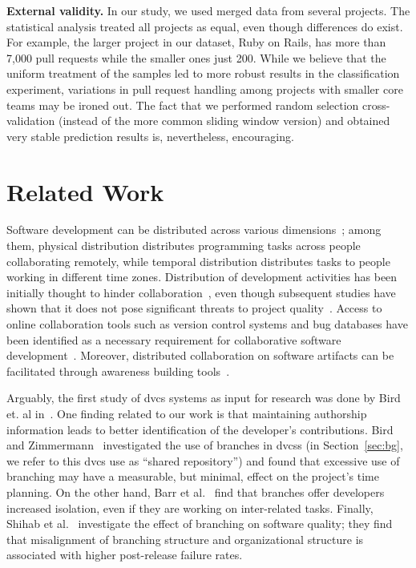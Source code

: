 \documentclass{sig-alternate}
\begin{document}
\textbf{External validity.} In our study, we used merged data from several
projects. The statistical analysis treated all projects as equal, even though
differences do exist.  For example, the larger project in our dataset, Ruby on
Rails, has more than 7,000 pull requests while the smaller ones just 200.  While
we believe that the uniform treatment of the samples led to more robust results
in the classification experiment, variations in pull request handling among
projects with smaller core teams may be ironed out.  The fact that we performed
random selection cross-validation (instead of the more common sliding window
version) and obtained very stable prediction results is, nevertheless,
encouraging.

\section{Related Work}

Software development can be distributed across various
di\-men\-sions~\cite{Gumm06}; among them, physical distribution distributes
programming tasks across people collaborating remotely, while temporal
distribution distributes tasks to people working in different time zones.
Distribution of development activities has been initially thought to hinder
collaboration~\cite{Herbs99, Batti01}, even though subsequent studies have
shown that it does not pose significant threats to project
quality~\cite{Spine06, Nguye08, Bird09a}. Access to online collaboration tools
such as version control systems and bug databases have been identified as a necessary
requirement for collaborative software development~\cite{Catal06}. Moreover, distributed collaboration on software artifacts can be
facilitated through awareness building tools~\cite{Dabbi12, Lanza10}. 

Arguably, the first study of {\sc dvcs} systems as input for research was done
by Bird et. al in~\cite{Bird09}. One finding related to our work is that
maintaining authorship information leads to better identification of the
developer's contributions. Bird and Zimmermann~\cite{Bird12} investigated the
use of branches in {\sc dvcs}s (in Section~\ref{sec:bg}, we refer to this {\sc
dvcs} use as ``shared repository'') and found that excessive use of branching
may have a measurable, but minimal, effect on the project's time planning.
On the other hand, Barr et al.~\cite{Barr12} find that branches offer developers
increased isolation, even if they are working on inter-related tasks.
Finally, Shihab et al.~\cite{Shiha12} investigate the effect of branching on
software quality; they find that misalignment of branching structure and organizational structure is associated with higher post-release failure rates.
\end{document}
